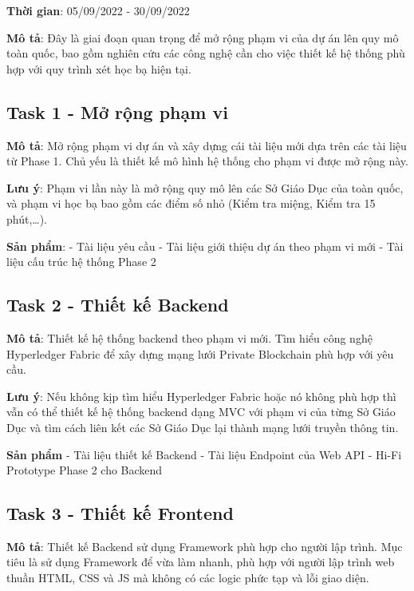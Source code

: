\documentclass[
  letterpaper,
  DIV=11,
  numbers=noendperiod]{scrreprt}
\begin{document}
\textbf{Thời gian}: 05/09/2022 - 30/09/2022

\textbf{Mô tả}: Đây là giai đoạn quan trọng để mở rộng phạm vi của dự án
lên quy mô toàn quốc, bao gồm nghiên cứu các công nghệ cần cho việc
thiết kế hệ thống phù hợp với quy trình xét học bạ hiện tại.

\hypertarget{task-1---mux1edf-rux1ed9ng-phux1ea1m-vi}{%
\subsection{Task 1 - Mở rộng phạm
vi}\label{task-1---mux1edf-rux1ed9ng-phux1ea1m-vi}}

\textbf{Mô tả}: Mở rộng phạm vi dự án và xây dựng cái tài liệu mới dựa
trên các tài liệu từ Phase 1. Chủ yếu là thiết kế mô hình hệ thống cho
phạm vi được mở rộng này.

\textbf{Lưu ý}: Phạm vi lần này là mở rộng quy mô lên các Sở Giáo Dục
của toàn quốc, và phạm vi học bạ bao gồm các điểm số nhỏ (Kiểm tra
miệng, Kiểm tra 15 phút,\ldots).

\textbf{Sản phẩm}: - Tài liệu yêu cầu - Tài liệu giới thiệu dự án theo
phạm vi mới - Tài liệu cấu trúc hệ thống Phase 2

\hypertarget{task-2---thiux1ebft-kux1ebf-backend}{%
\subsection{Task 2 - Thiết kế
Backend}\label{task-2---thiux1ebft-kux1ebf-backend}}

\textbf{Mô tả}: Thiết kế hệ thống backend theo phạm vi mới. Tìm hiểu
công nghệ Hyperledger Fabric để xây dựng mạng lưới Private Blockchain
phù hợp với yêu cầu.

\textbf{Lưu ý}: Nếu không kịp tìm hiểu Hyperledger Fabric hoặc nó không
phù hợp thì vẫn có thể thiết kế hệ thống backend dạng MVC với phạm vi
của từng Sở Giáo Dục và tìm cách liên kết các Sở Giáo Dục lại thành mạng
lưới truyền thông tin.

\textbf{Sản phẩm} - Tài liệu thiết kế Backend - Tài liệu Endpoint của
Web API - Hi-Fi Prototype Phase 2 cho Backend

\hypertarget{task-3---thiux1ebft-kux1ebf-frontend}{%
\subsection{Task 3 - Thiết kế
Frontend}\label{task-3---thiux1ebft-kux1ebf-frontend}}

\textbf{Mô tả}: Thiết kế Backend sử dụng Framework phù hợp cho người lập
trình. Mục tiêu là sử dụng Framework để vừa làm nhanh, phù hợp với người
lập trình web thuần HTML, CSS và JS mà không có các logic phức tạp và
lỗi giao diện.
\end{document}
